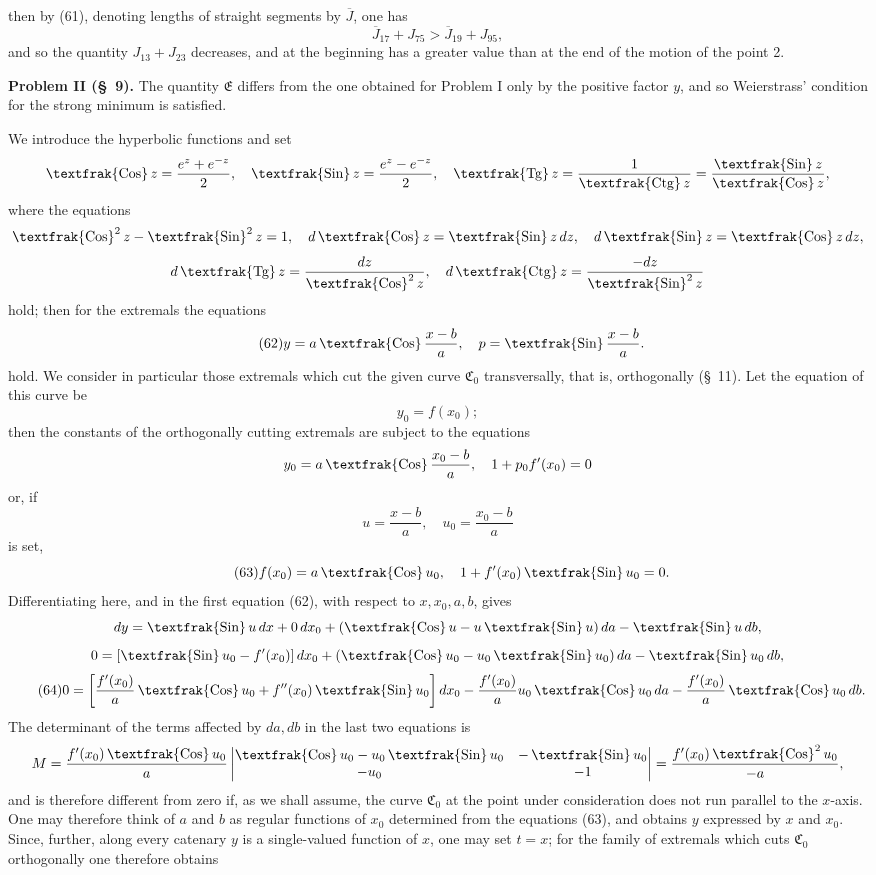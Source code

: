 \documentclass[11pt,a4paper,leqno]{article}
\newcommand{\Cof}{\mathop{\text{\textfrak{Cos}}}\nolimits}
\newcommand{\Sin}{\mathop{\text{\textfrak{Sin}}}\nolimits}
\newcommand{\Tg}{\mathop{\text{\textfrak{Tg}}}\nolimits}
\newcommand{\Ctg}{\mathop{\text{\textfrak{Ctg}}}\nolimits}
\begin{document}
 then by (61), denoting lengths of straight segments by $\overline{J}$, one has
\[
\overline{J}_{17}+J_{75}>\overline{J}_{19}+J_{95},
\]
and so the quantity $J_{13}+J_{23}$ decreases, and at the beginning has a greater value than at the end of the motion of the point 2.



\noindent\textbf{Problem II (\S~9).} The quantity $\mathfrak{E}$ differs from the one obtained for Problem I only by the positive factor $y$, and so Weierstrass' condition for the strong minimum is satisfied.

We introduce the hyperbolic functions and set
\[
\Cof z=\frac{e^z+e^{-z}}{2},\quad
\Sin z=\frac{e^z-e^{-z}}{2},\quad
\Tg z=\frac{1}{\Ctg z}=\frac{\Sin z}{\Cof z},
\]
where the equations
\[
\Cof^2z-\Sin^2z=1,\quad
d\Cof z=\Sin z\,dz,\quad
d\Sin z=\Cof z\,dz,
\]
\[
d\Tg z=\frac{dz}{\Cof^2z},\quad
d\Ctg z=\frac{-dz}{\Sin^2z}
\]
hold; then for the extremals the equations
\begin{equation}\tag{62}
y=a\Cof\frac{x-b}{a},\quad
p=\Sin\frac{x-b}{a}.
\end{equation}
hold. We consider in particular those extremals which cut the given curve $\mathfrak{C}_0$ transversally, that is, orthogonally (\S~11). Let the equation of this curve be
\[
y_0=f(x_0);
\]
then the constants of the orthogonally cutting extremals are subject to the equations
\[
y_0=a\Cof\frac{x_0-b}{a},\quad
1+p_0f'(x_0)=0
\]
or, if
\[
u=\frac{x-b}{a},\quad u_0=\frac{x_0-b}{a}
\]
is set,
\begin{equation}\tag{63}
f(x_0)=a\Cof u_0,\quad
1+f'(x_0)\Sin u_0=0.
\end{equation}
Differentiating here, and in the first equation (62), with respect to $x,x_0,a,b$, gives
\[
dy=\Sin u\,dx+0\,dx_0+(\Cof u-u\Sin u)\,da-\Sin u\,db,
\]
\[
0=[\Sin u_0-f'(x_0)]\,dx_0+(\Cof u_0-u_0\Sin u_0)\,da-\Sin u_0\,db,
\]
\begin{equation}\tag{64}
0=
\left[\frac{f'(x_0)}{a}\Cof u_0+f''(x_0)\Sin u_0\right]dx_0
-\frac{f'(x_0)}{a}u_0\Cof u_0\,da
-\frac{f'(x_0)}{a}\Cof u_0\,db.
\end{equation}
The determinant of the terms affected by $da,db$ in the last two equations is
\[
M=
\frac{f'(x_0)\Cof u_0}{a}
\begin{vmatrix}
\Cof u_0-u_0\Sin u_0 & -\Sin u_0\\
-u_0 & -1
\end{vmatrix}
=
\frac{f'(x_0)\Cof^2u_0}{-a},
\]
and is therefore different from zero if, as we shall assume, the curve $\mathfrak{C}_0$ at the point under consideration does not run parallel to the $x$-axis. One may therefore think of $a$ and $b$ as regular functions of $x_0$ determined from the equations (63), and obtains $y$ expressed by $x$ and $x_0$. Since, further, along every catenary $y$ is a single-valued function of $x$, one may set $t=x$; for the family of extremals which cuts $\mathfrak{C}_0$ orthogonally one therefore obtains
\end{document}
